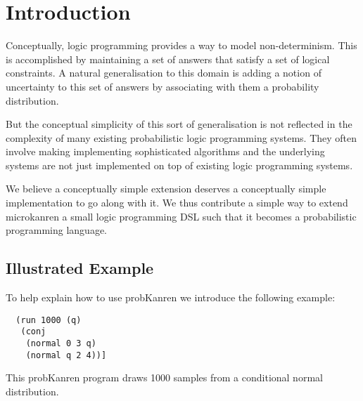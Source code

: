 \documentclass[
]{ceurart}
\begin{document}
\maketitle

\section{Introduction}

Conceptually, logic programming provides a way to model
non-determinism. This is accomplished by maintaining a set of answers
that satisfy a set of logical constraints. A natural generalisation
to this domain is adding a notion of uncertainty to this set of answers
by associating with them a probability distribution.

But the conceptual simplicity of this sort of generalisation is not reflected
in the complexity of many existing probabilistic logic programming systems.
They often involve making implementing sophisticated algorithms and the underlying
systems are not just implemented on top of existing logic programming systems.

We believe a conceptually simple extension deserves a conceptually
simple implementation to go along with it. We thus contribute a simple
way to extend microkanren a small logic programming DSL such that it
becomes a probabilistic programming language.

\subsection{Illustrated Example}

To help explain how to use probKanren we introduce the following example:


\begin{verbatim}
  (run 1000 (q)
   (conj
    (normal 0 3 q)
    (normal q 2 4))]
\end{verbatim}


This probKanren program draws 1000 samples from a conditional normal distribution.
\end{document}
